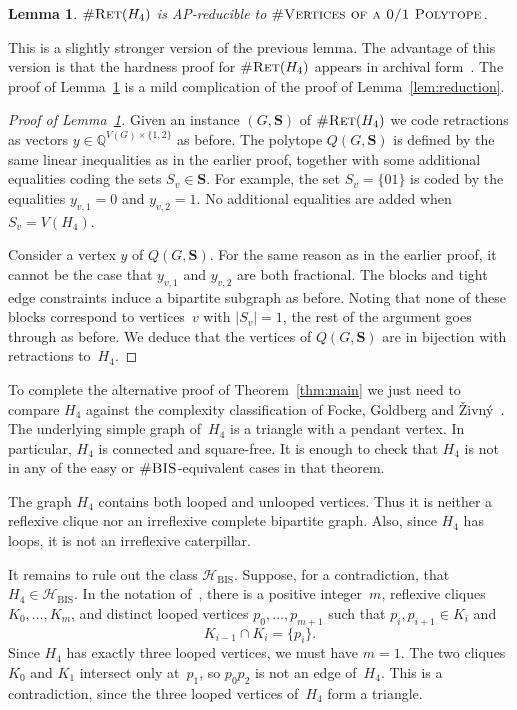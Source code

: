 \documentclass[11pt, oneside]{article}   	%
\newtheorem{lemma}[theorem]{Lemma}
\def\bfS{\mathbf S}
\def\nBIS{\textsc{\#BIS}}
\def\nRet{\textsc{\#Ret}}
\def\nPolytopeVertices{\textsc{\#Vertices of a 0/1 Polytope}}
\def\HBIS{\mathcal{H}_{\mathrm{BIS}}}
\def\Hfour{H_4}
\begin{document}
\begin{lemma}\label{lem:variantreduction}
$\nRet(\Hfour)$ is AP-reducible to $\nPolytopeVertices$.
\end{lemma}

This is a slightly stronger version of the previous lemma.
The advantage of this version is that the hardness proof for $\nRet(\Hfour)$ appears in archival form~\cite{FGZ21}.  The proof of Lemma~\ref{lem:variantreduction} is a mild complication of the proof of Lemma~\ref{lem:reduction}.

\begin{proof}[Proof of Lemma~\ref{lem:variantreduction}]\label{lem:variantreduction'}
Given an instance $(G,\bfS)$ of $\nRet(\Hfour)$ we code retractions as vectors $y\in\mathbb{Q}^{V(G)\times\{1,2\}}$ as before.  The polytope $Q(G,\bfS)$ is defined by the same linear inequalities as in the earlier proof, together with some additional equalities coding the sets $S_v\in\bfS$. For example, the set $S_v=\{01\}$ is coded by the equalities $y_{v,1}=0$ and $y_{v,2}=1$.  No additional equalities are added when $S_v=V(\Hfour)$.

Consider a vertex $y$ of $Q(G,\bfS)$. For the same reason as in the earlier proof, it cannot be the case that $y_{v,1}$ and $y_{v,2}$ are both fractional.  The blocks and tight edge constraints induce a bipartite subgraph as before.  Noting that none of these blocks correspond to vertices~$v$ with $|S_v|=1$, the rest of the argument goes through as before.  We deduce that the vertices of $Q(G,\bfS)$ are in bijection with retractions to~$\Hfour$.
\end{proof}

To complete the alternative proof of Theorem~\ref{thm:main} we just need to compare $\Hfour$ against the complexity classification of Focke, Goldberg and \v{Z}ivn\'y~\cite[Theorem~2]{FGZ21}.  
The underlying simple graph of~$\Hfour$ is a triangle with a pendant vertex.  In particular, $\Hfour$ is connected and square-free.  It is enough to check that $\Hfour$ is not in any of the easy or $\nBIS$-equivalent cases in that theorem. 

The graph $\Hfour$ contains both looped and unlooped vertices.  Thus it is neither a reflexive clique nor an irreflexive complete bipartite graph.  Also, since $\Hfour$ has loops, it is not an irreflexive caterpillar.

It remains to rule out the class $\HBIS$.  Suppose, for a contradiction, that $\Hfour\in\HBIS$.  In the notation of~\cite[Definition~10]{FGZ21}, there is a positive integer~$m$, reflexive cliques $K_0,\ldots,K_m$, and distinct looped vertices $p_0,\ldots,p_{m+1}$ such that $p_i,p_{i+1}\in K_i$ and
\[
 K_{i-1}\cap K_i=\{p_i\}.
\]
Since $\Hfour$ has exactly three looped vertices, we must have $m=1$.  The two cliques $K_0$ and $K_1$ intersect only at~$p_1$, so $p_0p_2$ is not an edge of~$\Hfour$.  This is a contradiction, since the three looped vertices of~$H_4$ form a triangle.
\end{document}
